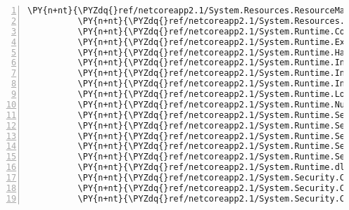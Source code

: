 \begin{Verbatim}[commandchars=\\\{\},numbers=left,firstnumber=1,stepnumber=1,numberblanklines=0]
          \PY{n+nt}{\PYZdq{}ref/netcoreapp2.1/System.Resources.ResourceManager.dll\PYZdq{}}\PY{p}{:} \PY{p}{\PYZob{}}\PY{p}{\PYZcb{}}\PY{p}{,}
          \PY{n+nt}{\PYZdq{}ref/netcoreapp2.1/System.Resources.Writer.dll\PYZdq{}}\PY{p}{:} \PY{p}{\PYZob{}}\PY{p}{\PYZcb{}}\PY{p}{,}
          \PY{n+nt}{\PYZdq{}ref/netcoreapp2.1/System.Runtime.CompilerServices.VisualC.dll\PYZdq{}}\PY{p}{:} \PY{p}{\PYZob{}}\PY{p}{\PYZcb{}}\PY{p}{,}
          \PY{n+nt}{\PYZdq{}ref/netcoreapp2.1/System.Runtime.Extensions.dll\PYZdq{}}\PY{p}{:} \PY{p}{\PYZob{}}\PY{p}{\PYZcb{}}\PY{p}{,}
          \PY{n+nt}{\PYZdq{}ref/netcoreapp2.1/System.Runtime.Handles.dll\PYZdq{}}\PY{p}{:} \PY{p}{\PYZob{}}\PY{p}{\PYZcb{}}\PY{p}{,}
          \PY{n+nt}{\PYZdq{}ref/netcoreapp2.1/System.Runtime.InteropServices.RuntimeInformation.dll\PYZdq{}}\PY{p}{:} \PY{p}{\PYZob{}}\PY{p}{\PYZcb{}}\PY{p}{,}
          \PY{n+nt}{\PYZdq{}ref/netcoreapp2.1/System.Runtime.InteropServices.WindowsRuntime.dll\PYZdq{}}\PY{p}{:} \PY{p}{\PYZob{}}\PY{p}{\PYZcb{}}\PY{p}{,}
          \PY{n+nt}{\PYZdq{}ref/netcoreapp2.1/System.Runtime.InteropServices.dll\PYZdq{}}\PY{p}{:} \PY{p}{\PYZob{}}\PY{p}{\PYZcb{}}\PY{p}{,}
          \PY{n+nt}{\PYZdq{}ref/netcoreapp2.1/System.Runtime.Loader.dll\PYZdq{}}\PY{p}{:} \PY{p}{\PYZob{}}\PY{p}{\PYZcb{}}\PY{p}{,}
          \PY{n+nt}{\PYZdq{}ref/netcoreapp2.1/System.Runtime.Numerics.dll\PYZdq{}}\PY{p}{:} \PY{p}{\PYZob{}}\PY{p}{\PYZcb{}}\PY{p}{,}
          \PY{n+nt}{\PYZdq{}ref/netcoreapp2.1/System.Runtime.Serialization.Formatters.dll\PYZdq{}}\PY{p}{:} \PY{p}{\PYZob{}}\PY{p}{\PYZcb{}}\PY{p}{,}
          \PY{n+nt}{\PYZdq{}ref/netcoreapp2.1/System.Runtime.Serialization.Json.dll\PYZdq{}}\PY{p}{:} \PY{p}{\PYZob{}}\PY{p}{\PYZcb{}}\PY{p}{,}
          \PY{n+nt}{\PYZdq{}ref/netcoreapp2.1/System.Runtime.Serialization.Primitives.dll\PYZdq{}}\PY{p}{:} \PY{p}{\PYZob{}}\PY{p}{\PYZcb{}}\PY{p}{,}
          \PY{n+nt}{\PYZdq{}ref/netcoreapp2.1/System.Runtime.Serialization.Xml.dll\PYZdq{}}\PY{p}{:} \PY{p}{\PYZob{}}\PY{p}{\PYZcb{}}\PY{p}{,}
          \PY{n+nt}{\PYZdq{}ref/netcoreapp2.1/System.Runtime.Serialization.dll\PYZdq{}}\PY{p}{:} \PY{p}{\PYZob{}}\PY{p}{\PYZcb{}}\PY{p}{,}
          \PY{n+nt}{\PYZdq{}ref/netcoreapp2.1/System.Runtime.dll\PYZdq{}}\PY{p}{:} \PY{p}{\PYZob{}}\PY{p}{\PYZcb{}}\PY{p}{,}
          \PY{n+nt}{\PYZdq{}ref/netcoreapp2.1/System.Security.Claims.dll\PYZdq{}}\PY{p}{:} \PY{p}{\PYZob{}}\PY{p}{\PYZcb{}}\PY{p}{,}
          \PY{n+nt}{\PYZdq{}ref/netcoreapp2.1/System.Security.Cryptography.Algorithms.dll\PYZdq{}}\PY{p}{:} \PY{p}{\PYZob{}}\PY{p}{\PYZcb{}}\PY{p}{,}
          \PY{n+nt}{\PYZdq{}ref/netcoreapp2.1/System.Security.Cryptography.Csp.dll\PYZdq{}}\PY{p}{:} \PY{p}{\PYZob{}}\PY{p}{\PYZcb{}}\PY{p}{,}

\end{Verbatim}
